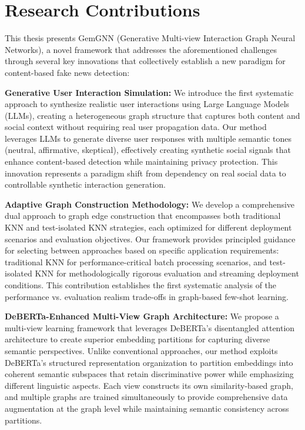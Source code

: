 \section{Research Contributions}

This thesis presents GemGNN (Generative Multi-view Interaction Graph Neural Networks), a novel framework that addresses the aforementioned challenges through several key innovations that collectively establish a new paradigm for content-based fake news detection:


\textbf{Generative User Interaction Simulation:} We introduce the first systematic approach to synthesize realistic user interactions using Large Language Models (LLMs), creating a heterogeneous graph structure that captures both content and social context without requiring real user propagation data. Our method leverages LLMs to generate diverse user responses with multiple semantic tones (neutral, affirmative, skeptical), effectively creating synthetic social signals that enhance content-based detection while maintaining privacy protection. This innovation represents a paradigm shift from dependency on real social data to controllable synthetic interaction generation.


\textbf{Adaptive Graph Construction Methodology:} We develop a comprehensive dual approach to graph edge construction that encompasses both traditional KNN and test-isolated KNN strategies, each optimized for different deployment scenarios and evaluation objectives. Our framework provides principled guidance for selecting between approaches based on specific application requirements: traditional KNN for performance-critical batch processing scenarios, and test-isolated KNN for methodologically rigorous evaluation and streaming deployment conditions. This contribution establishes the first systematic analysis of the performance vs. evaluation realism trade-offs in graph-based few-shot learning.

\textbf{DeBERTa-Enhanced Multi-View Graph Architecture:} We propose a multi-view learning framework that leverages DeBERTa's disentangled attention architecture to create superior embedding partitions for capturing diverse semantic perspectives. Unlike conventional approaches, our method exploits DeBERTa's structured representation organization to partition embeddings into coherent semantic subspaces that retain discriminative power while emphasizing different linguistic aspects. Each view constructs its own similarity-based graph, and multiple graphs are trained simultaneously to provide comprehensive data augmentation at the graph level while maintaining semantic consistency across partitions.

